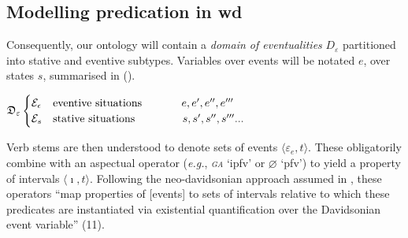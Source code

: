 \subsection{Modelling predication in \gls{wd}}
Consequently, our ontology will contain a \textit{domain of eventualities} $ D_\varepsilon $ partitioned into stative and eventive subtypes. Variables over events will be notated $ e $, over states $ s $, summarised in (\nextx).

\ex $ \mathfrak D_\varepsilon \begin{cases}
	\mathcal E_\epsilon	& \text{eventive situations}\hspace{.5in} e,e',e'',e'''\\
	\mathcal E_s	& \text{stative situations}\hspace{.6in} s,s',s'',s'''...
\end{cases} $\xe


Verb stems are then understood to denote sets of events $ \langle \varepsilon_e,t\rangle $. These obligatorily combine with an aspectual operator (\textit{e.g.}, \textit{\textsc{ga}} `\gls{ipfv}' or $ \varnothing $ `\gls{pfv}') %
to yield a property of intervals $ \langle\imath,t\rangle $. Following the neo-davidsonian approach assumed in \citet{Deo2015}, these operators ``map properties of [events] to sets of intervals relative to which these predicates are instantiated via existential quantification over the Davidsonian event variable'' (11).



